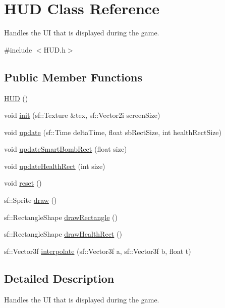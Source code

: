 \hypertarget{class_h_u_d}{}\section{H\+UD Class Reference}
\label{class_h_u_d}


Handles the UI that is displayed during the game.  




{\ttfamily \#include $<$H\+U\+D.\+h$>$}

\subsection*{Public Member Functions}
\begin{DoxyCompactItemize}
\item 
\hyperlink{class_h_u_d_a568b8ee1591f9ba3ed36ae05966f6b56}{H\+UD} ()
\item 
void \hyperlink{class_h_u_d_abcd24489d983e367e38f1ee35e4f0cef}{init} (sf\+::\+Texture \&tex, sf\+::\+Vector2i screen\+Size)
\item 
void \hyperlink{class_h_u_d_a82e0269135f98973429dc257bb1c7d5a}{update} (sf\+::\+Time delta\+Time, float sb\+Rect\+Size, int health\+Rect\+Size)
\item 
void \hyperlink{class_h_u_d_a44b111c7f1f1c246203bd87f4ebff786}{update\+Smart\+Bomb\+Rect} (float size)
\item 
void \hyperlink{class_h_u_d_a6112a6edad58595a45c8f63f354615ee}{update\+Health\+Rect} (int size)
\item 
void \hyperlink{class_h_u_d_a9800d7a76e53e33264f444fd5c863bff}{reset} ()
\item 
sf\+::\+Sprite \hyperlink{class_h_u_d_a56cec922eca7a584bdc3799fbeaaf990}{draw} ()
\item 
sf\+::\+Rectangle\+Shape \hyperlink{class_h_u_d_acdbc5c7a94d57dd938a3d5b8514f1d78}{draw\+Rectangle} ()
\item 
sf\+::\+Rectangle\+Shape \hyperlink{class_h_u_d_aa87cf43eb5aa5c6e0c050f7d46064fbc}{draw\+Health\+Rect} ()
\item 
sf\+::\+Vector3f \hyperlink{class_h_u_d_aeb9ac3973c124a7e893d6c3cc9c8688f}{interpolate} (sf\+::\+Vector3f a, sf\+::\+Vector3f b, float t)
\end{DoxyCompactItemize}


\subsection{Detailed Description}
Handles the UI that is displayed during the game. 




